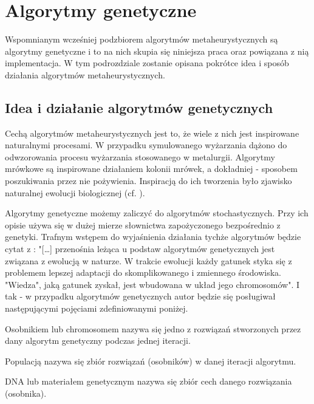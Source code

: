 \section{Algorytmy genetyczne}

Wspomnianym wcześniej podzbiorem algorytmów metaheurystycznych są algorytmy genetyczne i to na nich skupia się niniejsza praca oraz powiązana z nią implementacja. W tym podrozdziale zostanie opisana pokrótce idea i sposób działania algorytmów metaheurystycznych.

\subsection{Idea i działanie algorytmów genetycznych}

Cechą algorytmów metaheurystycznych jest to, że wiele z nich jest inspirowane naturalnymi procesami. W przypadku symulowanego wyżarzania dążono do odwzorowania procesu wyżarzania stosowanego w metalurgii. Algorytmy mrówkowe są inspirowane działaniem kolonii mrówek, a dokładniej - sposobem poszukiwania przez nie pożywienia. Inspiracją do ich tworzenia było zjawisko naturalnej ewolucji biologicznej (cf. \cite{AlgorytmyGenetyczne}).

Algorytmy genetyczne możemy zaliczyć do algorytmów stochastycznych. Przy ich opisie używa się w dużej mierze słownictwa zapożyczonego bezpośrednio z genetyki. Trafnym wstępem do wyjaśnienia działania tychże algorytmów będzie cytat z \cite{GeneticAlgorithmsAndSimulatedAnnealing}: "[\ldots] przenośnia leżąca u podstaw algorytmów genetycznych jest związana z ewolucją w naturze. W trakcie ewolucji każdy gatunek styka się z problemem lepszej adaptacji do skomplikowanego i zmiennego środowiska. "Wiedza", jaką gatunek zyskał, jest wbudowana w układ jego chromosomów". I tak - w przypadku algorytmów genetycznych autor będzie się posługiwał następującymi pojęciami zdefiniowanymi poniżej.

\begin{definition}
Osobnikiem lub chromosomem nazywa się jedno z rozwiązań stworzonych przez dany algorytm genetyczny podczas jednej iteracji.
\end{definition}

\begin{definition}
Populacją nazywa się zbiór rozwiązań (osobników) w danej iteracji algorytmu.
\end{definition}

\begin{definition}
DNA lub materiałem genetycznym nazywa się zbiór cech danego rozwiązania (osobnika).
\end{definition}

